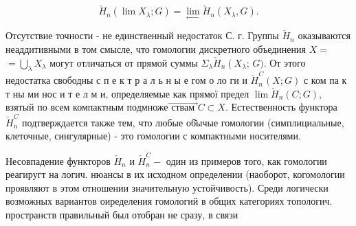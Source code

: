 \documentclass[10pt]{article}
\begin{document}
\[

\check{H}_{n}\left(\lim X_{\lambda} ; G\right)=\lim _{\leftarrow} \check{H}_{n}\left(X_{\lambda}, G\right) .

\]



Отсутствие точности - не единственный недостаток С. г. Группы $\check{H}_{n}$ оказываются неаддитивными в том смысле, что гомологии дискретного объединения $X=$ $=\bigcup_{\lambda} X_{\lambda}$ могут отличаться от прямой суммы $\Sigma_{\lambda} \check{H}_{n}\left(X_{\lambda}\right.$; $G)$. От этого недостатка свободны с п е к т р а л ь н ы е гом о ло ги и $\breve{H}_{n}^{C}(X ; G)$ с ком па к т ны ми нос и т е л м и, определяемые как прямої предел $\lim \check{H}_{n}(C ; G)$, взятый по всем компактным подмноже$\overrightarrow{\text { ствам }} C \subset X$. Естественность функтора $\check{H}_{n}^{C}$ подтверждается также тем, что любые об̆ычые гомологии (симплициальные, клеточные, сингулярные) - это гомологии с компактными носителями.



Несовпадение функторов $\check{H}_{n}$ и $\check{H}_{n}^{C}-$ один из примеров того, как гомологии реагиругт на логич. нюансы в их исходном определении (наоборот, когомологии проявляют в этом отношении значительную устойчивость). Среди логически возможных вариантов оиределения гомологий в общих категориях топологич. пространств правильный был отобран не сразу, в связи
\end{document}
